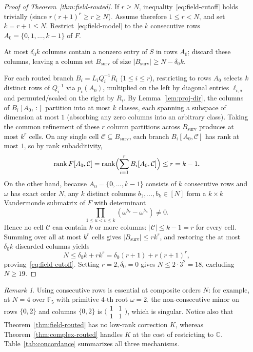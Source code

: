 \documentclass[11pt,reqno]{amsart}
\numberwithin{equation}{section}
\theoremstyle{definition}
\theoremstyle{remark}
\newtheorem{remark}[theorem]{Remark}
\newcommand{\C}{\mathbb{C}}
\newcommand{\F}{\mathbb{F}}
\newcommand{\rank}{\operatorname{rank}}
\begin{document}
\begin{proof}[Proof of Theorem~\ref{thm:field-routed}]
If $r\ge N$, inequality~\eqref{eq:field-cutoff} holds trivially (since $r(r+1)^r \ge r\ge N$). Assume therefore $1\le r < N$, and set $k = r + 1\le N$. Restrict~\eqref{eq:field-model} to the $k$ consecutive rows $A_0 = \{0,1,\ldots,k-1\}$ of $F$.

At most $\delta_0 k$ columns contain a nonzero entry of $S$ in rows $A_0$; discard these columns, leaving a column set $B_{\mathrm{surv}}$ of size $|B_{\mathrm{surv}}| \ge N - \delta_0 k$.

For each routed branch $B_i = L_i Q_i^{-1} R_i$ ($1\le i\le r$), restricting to rows $A_0$ selects $k$ distinct rows of $Q_i^{-1}$ via $p_i(A_0)$, multiplied on the left by diagonal entries $\ell_{i,a}$ and permuted/scaled on the right by $R_i$. By Lemma~\ref{lem:proj-dir}, the columns of $B_i[A_0,\,{:}]$ partition into at most $k$ classes, each spanning a subspace of dimension at most $1$ (absorbing any zero columns into an arbitrary class). Taking the common refinement of these $r$ column partitions across $B_{\mathrm{surv}}$ produces at most $k^r$ cells. On any single cell $\mathcal{C}\subseteq B_{\mathrm{surv}}$, each branch $B_i[A_0,\mathcal{C}]$ has rank at most $1$, so by rank subadditivity,
\[
\rank F[A_0,\mathcal{C}] = \rank\Bigl(\sum_{i=1}^r B_i[A_0,\mathcal{C}]\Bigr) \le r = k - 1.
\]
On the other hand, because $A_0=\{0,\ldots,k-1\}$ consists of $k$ consecutive rows and $\omega$ has exact order $N$, any $k$ distinct columns $b_1,\ldots,b_k\in[N]$ form a $k\times k$ Vandermonde submatrix of $F$ with determinant
\[
\prod_{1\le u < v\le k} (\omega^{b_v} - \omega^{b_u}) \neq 0.
\]
Hence no cell $\mathcal{C}$ can contain $k$ or more columns: $|\mathcal{C}|\le k - 1 = r$ for every cell. Summing over all at most $k^r$ cells gives $|B_{\mathrm{surv}}|\le r k^r$, and restoring the at most $\delta_0 k$ discarded columns yields
\[
N \le \delta_0 k + r k^r = \delta_0(r + 1) + r(r + 1)^r,
\]
proving~\eqref{eq:field-cutoff}. Setting $r=2, \delta_0=0$ gives $N\le 2\cdot 3^2 = 18$, excluding $N\ge 19$.
\end{proof}

\begin{remark}
Using consecutive rows is essential at composite orders $N$: for example, at $N=4$ over $\F_5$ with primitive $4$-th root $\omega=2$, the non-consecutive minor on rows $\{0,2\}$ and columns $\{0,2\}$ is $\bigl(\begin{smallmatrix}1&1\\1&1\end{smallmatrix}\bigr)$, which is singular. Notice also that Theorem~\ref{thm:field-routed} has no low-rank correction $K$, whereas Theorem~\ref{thm:complex-routed} handles $K$ at the cost of restricting to $\C$. Table~\ref{tab:concordance} summarizes all three mechanisms.
\end{remark}
\end{document}
